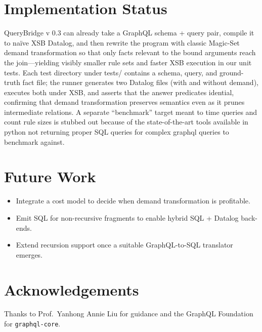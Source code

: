 \documentclass[11pt]{article}
\begin{document}
\section{Implementation Status}
QueryBridge v 0.3 can already take a GraphQL schema + query pair, compile it to naïve XSB Datalog, and then rewrite the program with classic Magic-Set demand transformation so that only facts relevant to the bound arguments reach the join—yielding visibly smaller rule sets and faster XSB execution in our unit tests. Each test directory under tests/ contains a schema, query, and ground-truth fact file; the runner generates two Datalog files (with and without demand), executes both under XSB, and asserts that the answer predicates idential, confirming that demand transformation preserves semantics even as it prunes intermediate relations. A separate “benchmark” target meant to time queries and count rule sizes is stubbed out because of the state-of-the-art tools available in python not returning proper SQL queries for complex graphql queries to benchmark against.

\section{Future Work}
\begin{itemize}[leftmargin=1.5em]
  \item Integrate a cost model to decide when demand transformation is profitable.
  \item Emit SQL for non-recursive fragments to enable hybrid SQL + Datalog back-ends.
  \item Extend recursion support once a suitable GraphQL-to-SQL translator emerges.
\end{itemize}

\section*{Acknowledgements}
Thanks to Prof.\ Yanhong Annie Liu for guidance and the GraphQL Foundation for
\texttt{graphql-core}.
\end{document}
